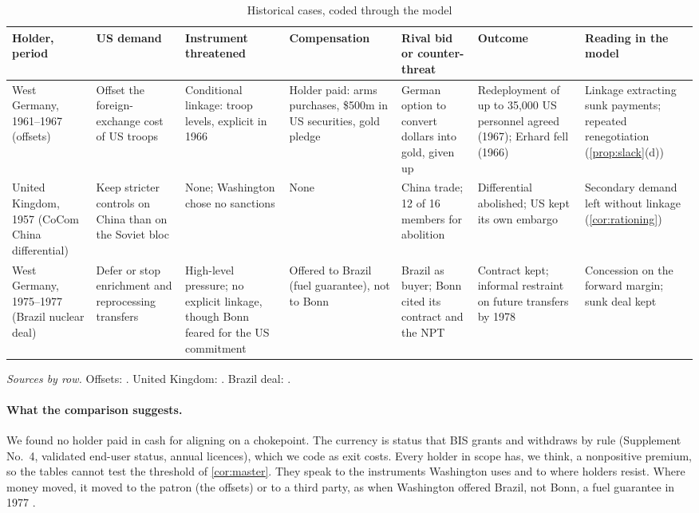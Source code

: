 \begin{table}[t]
\centering
\scriptsize
\setlength{\tabcolsep}{2.5pt}
\caption{Historical cases, coded through the model}\label{tab:history}
\begin{tabularx}{\textwidth}{@{}>{\raggedright\arraybackslash}p{1.7cm}*{6}{>{\raggedright\arraybackslash}X}@{}}
\toprule
Holder, period & US demand & Instrument threatened & Compensation & Rival bid or counter-threat & Outcome & Reading in the model\\
\midrule
West Germany, 1961--1967 (offsets) & Offset the foreign-exchange cost of US troops & Conditional linkage: troop levels, explicit in 1966 & Holder paid: arms purchases, \$500m in US securities, gold pledge & German option to convert dollars into gold, given up & Redeployment of up to 35,000 US personnel agreed (1967); Erhard fell (1966) & Linkage extracting sunk payments; repeated renegotiation (\cref{prop:slack}(d))\\
\addlinespace
United Kingdom, 1957 (CoCom China differential) & Keep stricter controls on China than on the Soviet bloc & None; Washington chose no sanctions & None & China trade; 12 of 16 members for abolition & Differential abolished; US kept its own embargo & Secondary demand left without linkage (\cref{cor:rationing})\\
\addlinespace
West Germany, 1975--1977 (Brazil nuclear deal) & Defer or stop enrichment and reprocessing transfers & High-level pressure; no explicit linkage, though Bonn feared for the US commitment & Offered to Brazil (fuel guarantee), not to Bonn & Brazil as buyer; Bonn cited its contract and the NPT & Contract kept; informal restraint on future transfers by 1978 & Concession on the forward margin; sunk deal kept\\
\bottomrule
\end{tabularx}
\par\smallskip
\begin{minipage}{\textwidth}\scriptsize
\emph{Sources by row.} Offsets: \citet{frus1995foreignecon, frus1995westerneurope, frus1999germany, bundesbank1967blessing}. United Kingdom: \citet{frus1989economicdefense, hansard1957china}. Brazil deal: \citet{frus2015southamerica, frus2014westerneurope, frus2015nonproliferation}.
\end{minipage}
\end{table}

\paragraph{What the comparison suggests.} We found no holder paid in cash for aligning on a chokepoint. The currency is status that BIS grants and withdraws by rule (Supplement No.~4, validated end-user status, annual licences), which we code as exit costs. Every holder in scope has, we think, a nonpositive premium, so the tables cannot test the threshold of \cref{cor:master}. They speak to the instruments Washington uses and to where holders resist. Where money moved, it moved to the patron (the offsets) or to a third party, as when Washington offered Brazil, not Bonn, a fuel guarantee in 1977 \citep{frus2015nonproliferation}.

